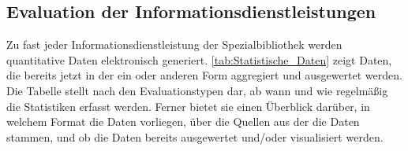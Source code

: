\subsection{Evaluation der Informationsdienstleistungen}

Zu fast jeder Informationsdienstleistung der Spezialbibliothek werden quantitative Daten elektronisch generiert. 
\autoref{tab:Statistische_Daten} zeigt Daten, die bereits jetzt in der ein oder anderen Form aggregiert und ausgewertet werden. 
Die Tabelle stellt nach den Evaluationstypen dar, ab wann und wie regelmäßig die Statistiken erfasst werden. Ferner bietet sie einen Überblick darüber, in welchem 
Format die Daten vorliegen, über die Quellen aus der die Daten stammen, und ob die Daten bereits ausgewertet und/oder visualisiert werden.


\begingroup
\setlength{\tabcolsep}{4pt} %
